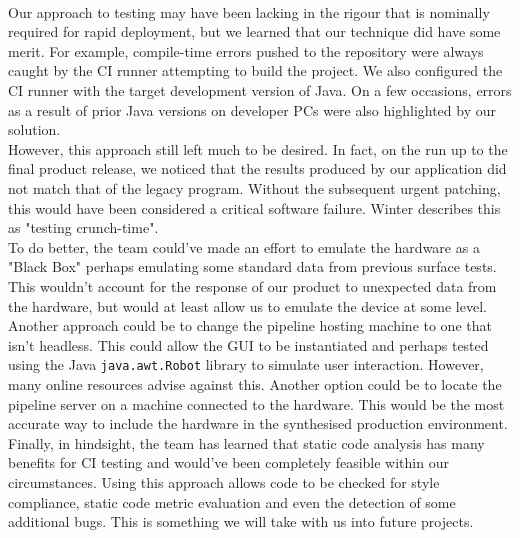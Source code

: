 \documentclass{l3proj}
\begin{document}
\\Our approach to testing may have been lacking in the rigour that is nominally required for rapid deployment, but we learned that our technique did have some merit. For example, compile-time errors pushed to the repository were always caught by the CI runner attempting to build the project. 
We also configured the CI runner with the target development version of Java. On a few occasions, errors as a result of prior Java versions on developer PCs were also highlighted by our solution. 
\\However, this approach still left much to be desired. In fact, on the run up to the final product release, we noticed that the results produced by our application did not match that of the legacy program. Without the subsequent urgent patching, this would have been considered a critical software failure. Winter describes this as "testing crunch-time"\cite{winter}. 
\\To do better, the team could've made an effort to emulate the hardware as a "Black Box" perhaps emulating some standard data from previous surface tests. This wouldn't account for the response of our product to unexpected data from the hardware, but would at least allow us to emulate the device at some level. Another approach could be to change the pipeline hosting machine to one that isn't headless. This could allow the GUI to be instantiated and perhaps tested using the Java \verb|java.awt.Robot| library to simulate user interaction. However, many online resources advise against this\cite{ruiz}.
Another option could be to locate the pipeline server on a machine connected to the hardware. This would be the most accurate way to include the hardware in the synthesised production environment. Finally, in hindsight, the team has learned that static code analysis has many benefits for CI testing and would've been completely feasible within our circumstances. Using this approach allows code to be checked for style compliance, static code metric evaluation and even the detection of some additional bugs\cite{balachandran}. This is something we will take with us into future projects.
\end{document}
